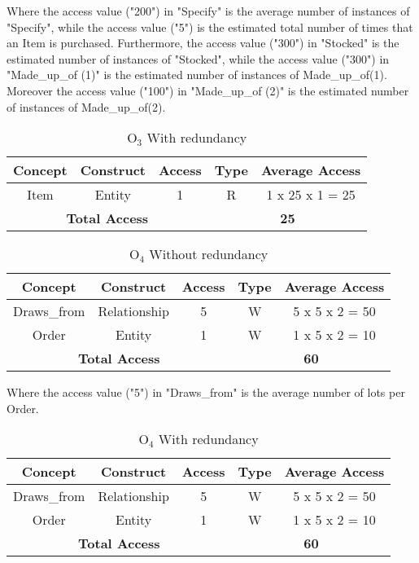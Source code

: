 Where the access value ("200") in "Specify" is the average number of instances of "Specify", while the access value ("5") is the estimated total number of times that an Item is purchased. Furthermore, the access value ("300") in "Stocked" is the estimated number of instances of "Stocked", while the access value ("300") in "Made\_up\_of (1)" is the estimated number of instances of Made\_up\_of(1). Moreover the access value ("100") in "Made\_up\_of (2)" is the estimated number of instances of Made\_up\_of(2).

\begin{table}[!h]\caption{	$ \textrm{O}_\textrm{3} $ With redundancy }
	\begin{center}
		\begin{tabular}{| c | c | c | c | c |}
			\hline
			\textbf{Concept} & \textbf{Construct} & \textbf{Access} & \textbf{Type} & \textbf{Average Access} \\ \hline
			Item & Entity & 1 & R & 1 x 25 x 1 = 25 \\ \hline
			\multicolumn{3}{|c|}{\textbf{Total Access}} & \multicolumn{2}{|c|}{\textbf{25}} \\ \hline
		\end{tabular}
	\end{center}
\end{table}
\begin{table}[!h]\caption{	$ \textrm{O}_\textrm{4} $ Without redundancy }
	\begin{center}
		\begin{tabular}{| c | c | c | c | c |}
			\hline
			\textbf{Concept} & \textbf{Construct} & \textbf{Access} & \textbf{Type} & \textbf{Average Access} \\ \hline
			Draws\_from & Relationship & 5 & W & 5 x 5 x 2 = 50 \\ \hline
			Order & Entity & 1 & W & 1 x 5 x 2 = 10 \\ \hline
			\multicolumn{3}{|c|}{\textbf{Total Access}} & \multicolumn{2}{|c|}{\textbf{60}} \\ \hline
		\end{tabular}
	\end{center}
\end{table}

Where the access value ("5") in "Draws\_from" is the average number of lots per Order.

\begin{table}[!h]\caption{	$ \textrm{O}_\textrm{4} $ With redundancy }
	\begin{center}
		\begin{tabular}{| c | c | c | c | c |}
			\hline
			\textbf{Concept} & \textbf{Construct} & \textbf{Access} & \textbf{Type} & \textbf{Average Access} \\ \hline
			Draws\_from & Relationship & 5 & W & 5 x 5 x 2 = 50 \\ \hline
			Order & Entity & 1 & W & 1 x 5 x 2 = 10 \\ \hline
			\multicolumn{3}{|c|}{\textbf{Total Access}} & \multicolumn{2}{|c|}{\textbf{60}} \\ \hline
		\end{tabular}
	\end{center}
\end{table}


